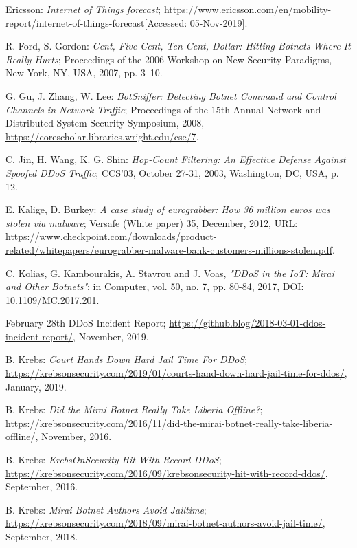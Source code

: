 \begin{thebibliography}{99}
 Ericsson: \emph{Internet of Things forecast}; \url{https://www.ericsson.com/en/mobility-report/internet-of-things-forecast}[Accessed: 05-Nov-2019].

 R. Ford, S. Gordon: \emph{Cent, Five Cent, Ten Cent, Dollar: Hitting Botnets Where It Really Hurts}; Proceedings of the 2006 Workshop on New Security Paradigms, New York, NY, USA, 2007, pp. 3--10.

 G. Gu, J. Zhang, W. Lee: \emph{BotSniffer: Detecting Botnet Command and Control Channels in Network Traffic}; Proceedings of the 15th Annual Network and Distributed System Security Symposium, 2008, \url{https://corescholar.libraries.wright.edu/cse/7}.

 C. Jin, H. Wang, K. G. Shin: \emph{Hop-Count Filtering: An Effective Defense Against Spoofed DDoS Traffic}; CCS'03, October 27-31, 2003, Washington, DC, USA, p. 12.

 E. Kalige, D. Burkey: \emph{A case study of eurograbber: How 36 million euros was stolen via malware}; Versafe (White paper) 35, December, 2012, URL: \url{https://www.checkpoint.com/downloads/product-related/whitepapers/eurograbber-malware-bank-customers-millions-stolen.pdf}.

 C. Kolias, G. Kambourakis, A. Stavrou and J. Voas, \emph{"DDoS in the IoT: Mirai and Other Botnets"}; in Computer, vol. 50, no. 7, pp. 80-84, 2017, DOI: 10.1109/MC.2017.201.

 February 28th DDoS Incident Report; \url{https://github.blog/2018-03-01-ddos-incident-report/}, November, 2019.

 B. Krebs: \emph{Court Hands Down Hard Jail Time For DDoS}; \url{https://krebsonsecurity.com/2019/01/courts-hand-down-hard-jail-time-for-ddos/}, January, 2019.

 B. Krebs: \emph{Did the Mirai Botnet Really Take Liberia Offline?}; \url{https://krebsonsecurity.com/2016/11/did-the-mirai-botnet-really-take-liberia-offline/}, November, 2016.

 B. Krebs: \emph{KrebsOnSecurity Hit With Record DDoS}; \url{https://krebsonsecurity.com/2016/09/krebsonsecurity-hit-with-record-ddos/}, September, 2016.

 B. Krebs: \emph{Mirai Botnet Authors Avoid Jailtime}; \url{https://krebsonsecurity.com/2018/09/mirai-botnet-authors-avoid-jail-time/}, September, 2018.


\end{thebibliography}
